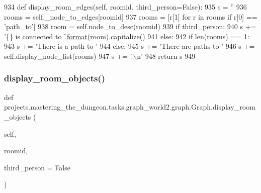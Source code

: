\begin{DoxyCode}
934     \textcolor{keyword}{def }display\_room\_edges(self, roomid, third\_person=False):
935         s = \textcolor{stringliteral}{''}
936         rooms = self.\_node\_to\_edges[roomid]
937         rooms = [r[1] \textcolor{keywordflow}{for} r \textcolor{keywordflow}{in} rooms \textcolor{keywordflow}{if} r[0] == \textcolor{stringliteral}{'path\_to'}]
938         room = self.node\_to\_desc(roomid)
939         \textcolor{keywordflow}{if} third\_person:
940             s += \textcolor{stringliteral}{'\{\} is connected to '}.\hyperlink{namespaceparlai_1_1chat__service_1_1services_1_1messenger_1_1shared__utils_a32e2e2022b824fbaf80c747160b52a76}{format}(room).capitalize()
941         \textcolor{keywordflow}{else}:
942             \textcolor{keywordflow}{if} len(rooms) == 1:
943                 s += \textcolor{stringliteral}{'There is a path to '}
944             \textcolor{keywordflow}{else}:
945                 s += \textcolor{stringliteral}{'There are paths to '}
946         s += self.display\_node\_list(rooms)
947         s += \textcolor{stringliteral}{'.\(\backslash\)n'}
948         \textcolor{keywordflow}{return} s
949 
\end{DoxyCode}
\mbox{\label{classprojects_1_1mastering__the__dungeon_1_1tasks_1_1graph__world2_1_1graph_1_1Graph_a466a066fe10c50b36b6290e271e3f299}} 
\subsubsection{\texorpdfstring{display\+\_\+room\+\_\+objects()}{display\_room\_objects()}}
{\footnotesize\ttfamily def projects.\+mastering\+\_\+the\+\_\+dungeon.\+tasks.\+graph\+\_\+world2.\+graph.\+Graph.\+display\+\_\+room\+\_\+objects (\begin{DoxyParamCaption}\item[{}]{self,  }\item[{}]{roomid,  }\item[{}]{third\+\_\+person = {\ttfamily False} }\end{DoxyParamCaption})}



